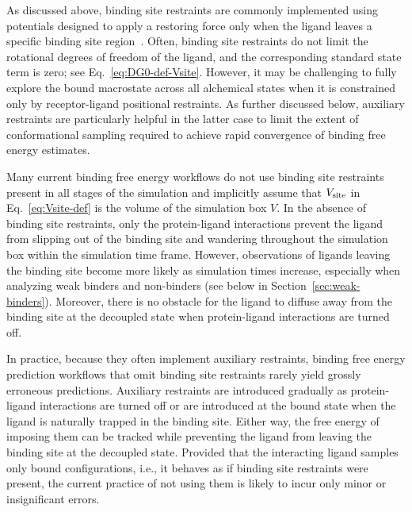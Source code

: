 \documentclass[9pt,bestpractices]{livecoms}
\begin{document}
As discussed above, binding site restraints are commonly implemented using potentials designed to apply a restoring force only when the ligand leaves a specific binding site region~\cite{chen2007can}. Often, binding site restraints do not limit the rotational degrees of freedom of the ligand, and the corresponding standard state term is zero; see Eq.~\ref{eq:DG0-def-Vsite}. However, it may be challenging to fully explore the bound macrostate across all alchemical states when it is constrained only by receptor-ligand positional restraints. As further discussed below, auxiliary restraints are particularly helpful in the latter case to limit the extent of conformational sampling required to achieve rapid convergence of binding free energy estimates.

Many current binding free energy workflows do not use binding site restraints present in all stages of the simulation and implicitly assume that $V_{\rm site}$ in Eq.~\ref{eq:Vsite-def} is the volume of the simulation box $V$. In the absence of binding site restraints, only the protein-ligand interactions prevent the ligand from slipping out of the binding site and wandering throughout the simulation box within the simulation time frame. However, observations of ligands leaving the binding site become more likely as simulation times increase, especially when analyzing weak binders and non-binders (see below in Section~\ref{sec:weak-binders}). Moreover, there is no obstacle for the ligand to diffuse away from the binding site at the decoupled state when protein-ligand interactions are turned off.

In practice, because they often implement auxiliary restraints, binding free energy prediction workflows that omit binding site restraints rarely yield grossly erroneous predictions. Auxiliary restraints are introduced gradually as protein-ligand interactions are turned off or are introduced at the bound state when the ligand is naturally trapped in the binding site. Either way, the free energy of imposing them can be tracked while preventing the ligand from leaving the binding site at the decoupled state. Provided that the interacting ligand samples only bound configurations, i.e., it behaves as if binding site restraints were present, the current practice of not using them is likely to incur only minor or insignificant errors. 
\end{document}
